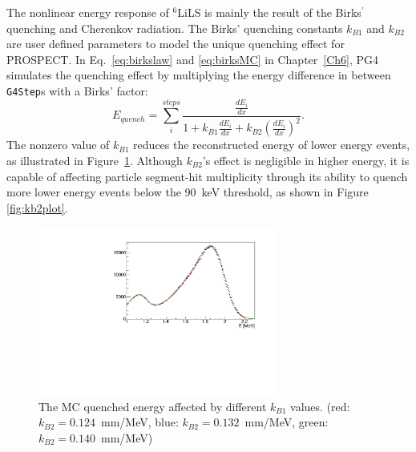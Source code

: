 \label{sec:nonlinear}

The nonlinear energy response of $^6$LiLS is mainly the result of the Birks$^\prime$ quenching and Cherenkov radiation. 
The Birks' quenching constants $k_{B1}$ and $k_{B2}$ are user defined parameters to model the unique quenching effect for PROSPECT.
In Eq.~\ref{eq:birkslaw} and \ref{eq:birksMC} in Chapter~\ref{Ch6}, PG4 simulates the quenching effect by multiplying the energy difference in between \texttt{G4Step}s with a Birks' factor:
\begin{equation}
   E_{quench} = \sum_{i}^{steps}\frac{\frac{dE_i}{dx}}{1+k_{B1}\frac{dE_i}{dx}+k_{B2}(\frac{dE_i}{dx})^2}.
   \label{eq:birks}
\end{equation}
The nonzero value of $k_{B1}$ reduces the reconstructed energy of lower energy events, as illustrated in Figure~\ref{fig:kb1plot}.
Although $k_{B2}$'s effect is negligible in higher energy, it is capable of affecting particle segment-hit multiplicity through its ability to quench more lower energy events below the 90~keV threshold, as shown in Figure \ref{fig:kb2plot}.

\begin{figure}[h!]
\centering
\includegraphics[width=0.7\textwidth]{Figures/kb1.pdf}
\caption[Quenched energy affected by different $k_{B1}$ values]{The MC quenched energy affected by different $k_{B1}$ values. (red:  $k_{B2} = 0.124$~mm/MeV, blue: $k_{B2} = 0.132$~mm/MeV, green: $k_{B2} = 0.140$~mm/MeV)}
\label{fig:kb1plot}
\end{figure}
 
